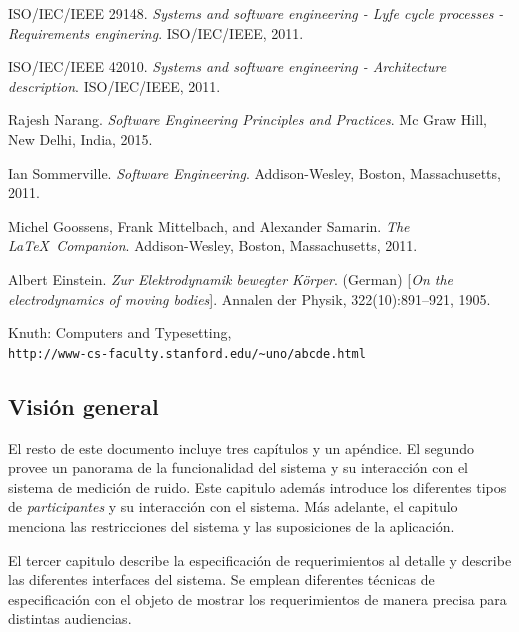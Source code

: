 \documentclass[paper=a4,oneside,fontsize=12pt]{scrartcl}
\newcommand{\smr}{sistema de medición de ruido}
\begin{document}
	\begingroup
		\renewcommand{\section}[2]{}
		\begin{thebibliography}{9}
			ISO/IEC/IEEE 29148. 
			\textit{Systems and software engineering - Lyfe cycle processes - Requirements enginering}. 
			ISO/IEC/IEEE, 2011.
			
			ISO/IEC/IEEE 42010. 
			\textit{Systems and software engineering - Architecture description}. 
			ISO/IEC/IEEE, 2011.		
			
			Rajesh Narang. 
			\textit{Software Engineering Principles and Practices}. 
			Mc Graw Hill, New Delhi, India, 2015.			
			
			Ian Sommerville. 
			\textit{Software Engineering}. 
			Addison-Wesley, Boston, Massachusetts, 2011.					
			
			Michel Goossens, Frank Mittelbach, and Alexander Samarin. 
			\textit{The \LaTeX\ Companion}. 
			Addison-Wesley, Boston, Massachusetts, 2011.		
			
			Albert Einstein. 
			\textit{Zur Elektrodynamik bewegter K{\"o}rper}. (German) 
			[\textit{On the electrodynamics of moving bodies}]. 
			Annalen der Physik, 322(10):891–921, 1905.
			
			Knuth: Computers and Typesetting,
			\\\texttt{http://www-cs-faculty.stanford.edu/\~{}uno/abcde.html}
		\end{thebibliography}
	\endgroup

	
	\subsection{Visión general}
	
	El resto de este documento incluye tres capítulos y un apéndice. El segundo provee un panorama de la funcionalidad del sistema y su interacción con el \smr. Este capitulo además introduce los diferentes tipos de \emph{participantes} y su interacción con el sistema. Más adelante, el capitulo menciona las restricciones del sistema y las suposiciones de la aplicación.
	
	El tercer capitulo describe la especificación de requerimientos al detalle y describe las diferentes interfaces del sistema. Se emplean diferentes técnicas de especificación con el objeto de mostrar los requerimientos de manera precisa para distintas audiencias.
	
\end{document}
